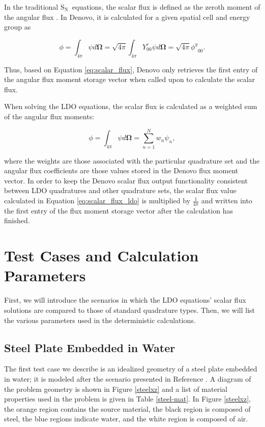 \documentclass{article} %
\newcommand{\bo}{\mathbf\Omega}
\newcommand{\sn}{S$_\mathrm{N}$}
\newcommand{\even}{\ensuremath{\phi^g}}
\begin{document}
In the traditional \sn\ equations, the scalar flux is
defined as the zeroth moment of the angular flux \cite{exmm}. In Denovo, it is
calculated for a given spatial cell and energy group as

\begin{equation}
\phi = \int_{4\pi}\psi d\bo = \sqrt{4\pi}\int_{4\pi}Y_{00}^{e}\psi d\bo
     = \sqrt{4\pi}\even_{00}.
\label{eq:scalar_flux}
\end{equation}

\noindent Thus, based on Equation \ref{eq:scalar_flux}, Denovo only retrieves
the first entry of the angular flux moment storage vector when called upon to
calculate the scalar flux.

When solving the LDO equations, the scalar flux is calculated as a 
weighted sum of the angular flux moments:

\begin{equation}
\phi = \int_{4\pi}\psi d\bo = \sum_{n=1}^{N}w_n\psi_n,
\label{eq:scalar_flux_ldo}
\end{equation}

\noindent where the weights are those associated with the particular quadrature
set and the angular flux coefficients are those values stored in the Denovo
flux moment vector. In order to keep the Denovo scalar flux output 
functionality consistent between LDO quadratures and other quadrature sets, the
scalar flux value calculated in Equation \ref{eq:scalar_flux_ldo} is multiplied
by $\tfrac{1}{4\pi}$ and written into the first entry of the flux moment
storage vector after the calculation has finished.

\section{Test Cases and Calculation Parameters}

First, we will introduce the scenarios in which the LDO equations' scalar flux
solutions are compared to those of standard quadrature types. Then, we will list
the various parameters used in the deterministic calculations.

\subsection{Steel Plate Embedded in Water}

The first test case we describe is an idealized geometry of a steel plate 
embedded in water; it is modeled after the scenario presented in Reference 
\cite{wilsonslaybaugh}. 
A diagram of the problem geometry is shown in Figure \ref{steelxz} and a list
of material properties used in the problem is given in Table \ref{steel-mat}.
In Figure \ref{steelxz}, the orange region contains the source material, the 
black region is composed of steel, the blue regions indicate water, and the 
white region is composed of air.
\end{document}
